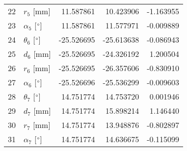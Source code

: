 \documentclass{standalone}%
\begin{document}
\begin{tabular}{llrrr}
22 &              $r_{5}$ [mm] &  11.587861 &  10.423906 &  -1.163955 \\
23 &  $\alpha_{5}$ [$\degree$] &  11.587861 &  11.577971 &  -0.009889 \\
24 &  $\theta_{6}$ [$\degree$] & -25.526695 & -25.613638 &  -0.086943 \\
25 &              $d_{6}$ [mm] & -25.526695 & -24.326192 &   1.200504 \\
26 &              $r_{6}$ [mm] & -25.526695 & -26.357606 &  -0.830910 \\
27 &  $\alpha_{6}$ [$\degree$] & -25.526696 & -25.536299 &  -0.009603 \\
28 &  $\theta_{7}$ [$\degree$] &  14.751774 &  14.753720 &   0.001946 \\
29 &              $d_{7}$ [mm] &  14.751774 &  15.898214 &   1.146440 \\
30 &              $r_{7}$ [mm] &  14.751774 &  13.948876 &  -0.802897 \\
31 &  $\alpha_{7}$ [$\degree$] &  14.751774 &  14.636675 &  -0.115099 \\
\bottomrule
\end{tabular}
%
\end{document}
